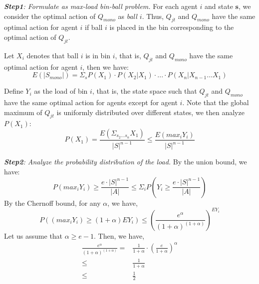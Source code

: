 \noindent \textit{\textbf{Step1}: Formulate as max-load bin-ball problem.} For each agent $i$ and state $\mathbf{s}$, we consider the optimal action of $Q_{mono}$ as \textit{ball $i$}. Thus, $Q_{jt}$ and $Q_{mono}$ have the same optimal action for  agent $i$ if ball $i$ is placed in the bin corresponding to the optimal action of $Q_{jt}$. 


Let $X_i$ denotes that ball $i$ is in bin $i$, that is,  $Q_{jt}$ and $Q_{mono}$ have the same optimal action for  agent $i$, then we have: 
\begin{equation}
    E(|S_{mono}|) = \Sigma_sP(X_1)\cdot P(X_2|X_1) \cdot...\cdot P(X_n|X_{n-1}...X_1) \nonumber
\label{S_mono}
\end{equation}

Define $Y_i$ as the load of bin $i$, that is, the state space such that $Q_{jt}$ and $Q_{mono}$ have the same optimal action for agents except for agent $i$.
Note that the global maximum of $Q_{jt}$ is uniformly distributed over different states, we then analyze $P(X_1)$:
\begin{equation}
P(X_1) =  \frac{E(\Sigma_{s_2...s_n}X_1)}{|S|^{n-1}}
\leq \frac{E(max_{i}Y_i)}{|S|^{n-1}}
\label{P_X_1}
\end{equation}

\noindent \noindent\textit{\textbf{Step2}: Analyze the probability distribution of the load.} 
By the union bound, we have:
\begin{equation} 
P(max_{i}Y_i) \geq \frac{e \cdot {|S|^{n-1}}}{|A|} \leq \Sigma_iP(Y_i \geq \frac{e \cdot {|S|^{n-1}}}{|A|})
\label{P_maxY_union}
\end{equation}
By the Chernoff bound, for any $\alpha$, we have,
\begin{equation} 
P((max_{i}Y_i) \geq (1+\alpha)EY_i) \leq ( \frac{e^\alpha }{(1+\alpha)^{(1+\alpha)}})^{EY_i}
\label{P_maxY_union}
\end{equation}
Let us assume that $\alpha \geq e-1 $. Then, we have,
\begin{equation} 
\begin{aligned}
\frac{e^\alpha }{(1+\alpha)^{(1+\alpha)}} = &\frac{1}{1+\alpha}\cdot (\frac{e}{1+\alpha})^\alpha \\
\leq &\frac{1}{1+\alpha} \\
\leq &\frac{1}{2}
\end{aligned}
\label{P_maxY_union}
\end{equation}

